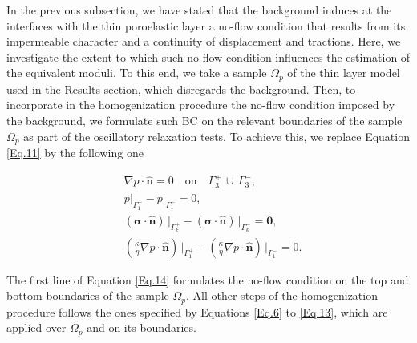 \documentclass[draft]{agujournal2019}
\begin{document}
In the previous subsection, we have stated that the background induces at the interfaces with the thin poroelastic layer a no-flow condition that results from its impermeable character and a continuity of displacement and tractions. Here, we investigate the extent to which such no-flow condition influences the estimation of the equivalent moduli. To this end, we  take a sample $\Omega_p$ of the thin layer model used in the Results section, which disregards the background. Then, to incorporate in the homogenization procedure the no-flow condition imposed by the background, we formulate such BC on the relevant boundaries of the sample $\Omega_p$ as part of the  oscillatory relaxation tests. To achieve this, we replace Equation \ref{Eq.11} by the following one
\begin{linenomath*}
\begin{equation}\label{Eq.14}
\begin{split}
& \nabla p \cdot \bm{\hat n}  = 0 \quad \text{on}\quad \Gamma_3^+ \, \cup \, \Gamma_3^-,\\
& p\vert_{\Gamma_1^+}-p\vert_{\Gamma_1^-} =0, \\
& \left(\bm{\sigma}\cdot \bm{\hat n} \right)\, \vert_{\Gamma_k^+}-\left(\bm{\sigma}\cdot \bm{\hat n} \right)\, \vert_{\Gamma_k^-} = \bm{0},\\
&\left( \frac{\kappa}{\eta} \nabla p \cdot \bm{\hat n} \right) \, \vert_{\Gamma_1^+} -\left( \frac{\kappa}{\eta} \nabla p \cdot \bm{\hat n} \right) \, \vert_{\Gamma_1^-} = 0.
\end{split}
\end{equation}
\end{linenomath*}
The first line of Equation \eqref{Eq.14} formulates the no-flow condition on the top and bottom boundaries of the sample $\Omega_p$. All other steps of the homogenization procedure follows the ones specified by Equations \eqref{Eq.6} to \eqref{Eq.13}, which are applied over $\Omega_p$ and on its boundaries.
\end{document}
